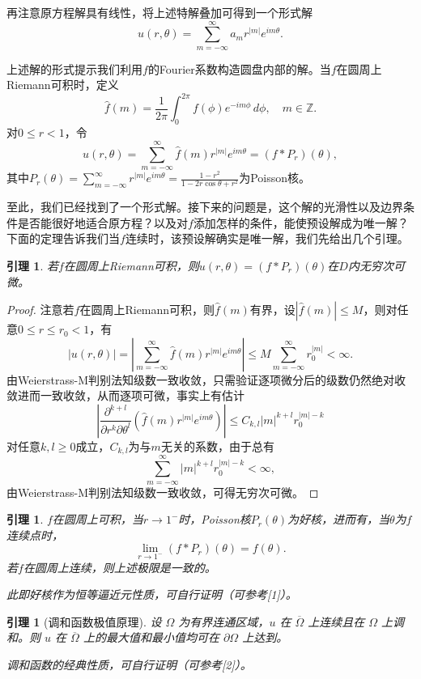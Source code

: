 \documentclass[UTF8,zihao=5,linespread=1.34]{ctexart}
\theoremstyle{cnplain}
\newtheorem{lemma}[theorem]{引理}
\theoremstyle{cnremark}
\begin{document}
再注意原方程解具有线性，将上述特解叠加可得到一个形式解
\[
u(r,\theta) = \sum_{m=-\infty}^{\infty} a_{m} r^{|m|} e^{im\theta}.
\]

上述解的形式提示我们利用$f$的Fourier系数构造圆盘内部的解。当$f$在圆周上Riemann可积时，定义
\[
\widehat{f}(m) = \frac{1}{2\pi}\int_{0}^{2\pi} f(\phi)e^{-im\phi}\,d\phi,
\quad m \in \mathbb{Z}.
\]
对$0 \leq r < 1$，令
\[
u(r,\theta) = \sum_{m=-\infty}^{\infty} \widehat{f}(m) r^{|m|} e^{im\theta} = (f * P_r)(\theta),
\]
其中$P_r(\theta) = \sum_{m=-\infty}^{\infty} r^{|m|} e^{im\theta} = \frac{1-r^{2}}{1-2r\cos\theta + r^{2}}$为Poisson核。

至此，我们已经找到了一个形式解。接下来的问题是，这个解的光滑性以及边界条件是否能很好地适合原方程？以及对$f$添加怎样的条件，能使预设解成为唯一解？下面的定理告诉我们当$f$连续时，该预设解确实是唯一解，我们先给出几个引理。

\begin{lemma}\label{lem:disk-smoothness}
若$f$在圆周上Riemann可积，则$u(r,\theta) = (f * P_r)(\theta)$在$D$内无穷次可微。
\end{lemma}

\begin{proof}
注意若$f$在圆周上Riemann可积，则$\widehat{f}(m)$有界，设$|\widehat{f}(m)| \leq M$，则对任意$0 \leq r \leq r_{0} < 1$，有
\[
|u(r,\theta)| = \left|\sum_{m=-\infty}^{\infty} \widehat{f}(m) r^{|m|} e^{im\theta}\right|
\leq M \sum_{m=-\infty}^{\infty} r_{0}^{|m|} < \infty.
\]
由Weierstrass-M判别法知级数一致收敛，只需验证逐项微分后的级数仍然绝对收敛进而一致收敛，从而逐项可微，事实上有估计
\[
\left|\frac{\partial^{k+l}}{\partial r^{k}\partial\theta^{l}}\left(\widehat{f}(m) r^{|m|} e^{im\theta}\right)\right|
\leq C_{k,l} |m|^{k+l} r_{0}^{|m|-k}
\]
对任意$k,l \geq 0$成立，$C_{k,l}$为与$m$无关的系数，由于总有
\[
\sum_{m=-\infty}^{\infty} |m|^{k+l} r_{0}^{|m|-k} < \infty,
\]
由Weierstrass-M判别法知级数一致收敛，可得无穷次可微。
\end{proof}

\begin{lemma}\label{lem:poisson-approximation}
$f$在圆周上可积，当$r \rightarrow 1^{-}$时，Poisson核$P_r(\theta)$为好核，进而有，当$\theta$为$f$连续点时，
\[
\lim_{r \rightarrow 1^{-}} (f * P_r)(\theta) = f(\theta).
\]
若$f$在圆周上连续，则上述极限是一致的。

此即好核作为恒等逼近元性质，可自行证明（可参考[1]）。
\end{lemma}

\begin{lemma}[调和函数极值原理]\label{lem:harmonic-maximum}
设 $\Omega$ 为有界连通区域，$u$ 在 $\overline{\Omega}$ 上连续且在 $\Omega$ 上调和。则 $u$ 在 $\overline{\Omega}$ 上的最大值和最小值均可在 $\partial\Omega$ 上达到。

调和函数的经典性质，可自行证明（可参考[2]）。
\end{lemma}
\end{document}
